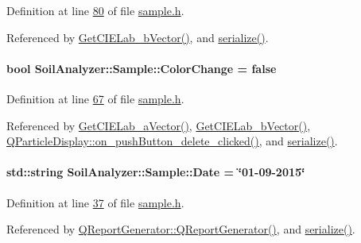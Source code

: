 Definition at line \hyperlink{sample_8h_source_l00080}{80} of file \hyperlink{sample_8h_source}{sample.\+h}.



Referenced by \hyperlink{sample_8cpp_source_l00104}{Get\+C\+I\+E\+Lab\+\_\+b\+Vector()}, and \hyperlink{sample_8h_source_l00085}{serialize()}.

\hypertarget{class_soil_analyzer_1_1_sample_accbcd4ae4cc33c94a1b1a4d255d4868f}{}
\paragraph[{Color\+Change}]{\setlength{\rightskip}{0pt plus 5cm}bool Soil\+Analyzer\+::\+Sample\+::\+Color\+Change = false}\label{class_soil_analyzer_1_1_sample_accbcd4ae4cc33c94a1b1a4d255d4868f}


Definition at line \hyperlink{sample_8h_source_l00067}{67} of file \hyperlink{sample_8h_source}{sample.\+h}.



Referenced by \hyperlink{sample_8cpp_source_l00094}{Get\+C\+I\+E\+Lab\+\_\+a\+Vector()}, \hyperlink{sample_8cpp_source_l00104}{Get\+C\+I\+E\+Lab\+\_\+b\+Vector()}, \hyperlink{qparticledisplay_8cpp_source_l00096}{Q\+Particle\+Display\+::on\+\_\+push\+Button\+\_\+delete\+\_\+clicked()}, and \hyperlink{sample_8h_source_l00085}{serialize()}.

\hypertarget{class_soil_analyzer_1_1_sample_a9d97841637bbbba5b50b62d51b1b1b81}{}
\paragraph[{Date}]{\setlength{\rightskip}{0pt plus 5cm}std\+::string Soil\+Analyzer\+::\+Sample\+::\+Date = \char`\"{}01-\/09-\/2015\char`\"{}}\label{class_soil_analyzer_1_1_sample_a9d97841637bbbba5b50b62d51b1b1b81}


Definition at line \hyperlink{sample_8h_source_l00037}{37} of file \hyperlink{sample_8h_source}{sample.\+h}.



Referenced by \hyperlink{qreportgenerator_8cpp_source_l00004}{Q\+Report\+Generator\+::\+Q\+Report\+Generator()}, and \hyperlink{sample_8h_source_l00085}{serialize()}.

